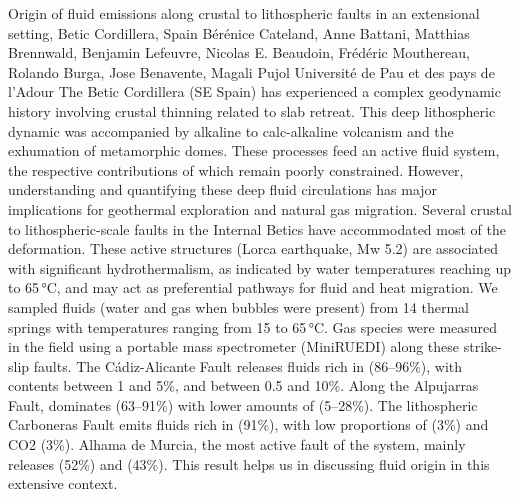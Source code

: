 \begin{conf-abstract}
{Origin of fluid emissions along crustal to lithospheric faults in an extensional setting, Betic Cordillera, Spain}
{Bérénice Cateland, Anne Battani, Matthias Brennwald, Benjamin Lefeuvre, Nicolas E. Beaudoin, Frédéric Mouthereau, Rolando Burga, Jose Benavente, Magali Pujol}
{Université de Pau et des pays de l'Adour}
{The Betic Cordillera (SE Spain) has experienced a complex geodynamic history involving crustal thinning related to slab retreat. This deep lithospheric dynamic was accompanied by alkaline to calc-alkaline volcanism and the exhumation of metamorphic domes. These processes feed an active fluid system, the respective contributions of which remain poorly constrained. However, understanding and quantifying these deep fluid circulations has major implications for geothermal exploration and natural gas migration. Several crustal to lithospheric-scale faults in the Internal Betics have accommodated most of the deformation. These active structures (Lorca earthquake, Mw 5.2) are associated with significant hydrothermalism, as indicated by water temperatures reaching up to 65\,°C, and may act as preferential pathways for fluid and heat migration. We sampled fluids (water and gas when bubbles were present) from 14 thermal springs with temperatures ranging from 15 to 65\,°C. Gas species were measured in the field using a portable mass spectrometer (MiniRUEDI) along these strike-slip faults. The Cádiz-Alicante Fault releases fluids rich in  (86–96\%), with  contents between 1 and 5\%, and  between 0.5 and 10\%. Along the Alpujarras Fault,  dominates (63–91\%) with lower amounts of  (5–28\%). The lithospheric Carboneras Fault emits fluids rich in  (91\%), with low proportions of  (3\%) and CO2 (3\%). Alhama de Murcia, the most active fault of the system, mainly releases  (52\%) and  (43\%). This result helps us in discussing fluid origin in this extensive context.}
\end{conf-abstract}
